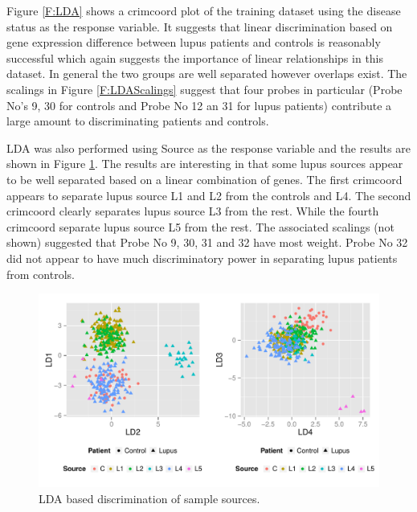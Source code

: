 \documentclass[a4paper, 12pt]{report}
\begin{document}

Figure \ref{F:LDA} shows a crimcoord plot of the training dataset using the disease status as the response variable. It suggests that linear discrimination based on gene expression difference between lupus patients and controls is reasonably successful which again suggests the importance of linear relationships in this dataset. In general the two groups are well separated however overlaps exist. The scalings in Figure \ref{F:LDAScalings} suggest that four probes in particular (Probe No's 9, 30 for controls and Probe No 12 an 31 for lupus patients) contribute a large amount to discriminating patients and controls. 

LDA was also performed using Source as the response variable and the results are shown in Figure \ref{F:LDAType}. The results are interesting in that some lupus sources appear to be well separated based on a linear combination of genes. The first crimcoord appears to separate lupus source L1 and L2 from the controls and L4. The second crimcoord clearly separates lupus source L3 from the rest. While the fourth crimcoord separate lupus source L5 from the rest. The associated scalings (not shown) suggested that Probe No 9, 30, 31 and 32 have most weight. Probe No 32 did not appear to have much discriminatory power in separating lupus patients from controls.

\begin{figure}[H]
\begin{centering}
\includegraphics[width=\textwidth]{ldaType.pdf}
\caption{LDA based discrimination of sample sources.} 
 \label{F:LDAType}
\end{centering}
\end{figure}
\end{document}
